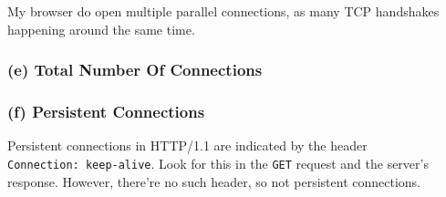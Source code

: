 \documentclass[
]{article}
\begin{document}
My browser do open multiple parallel connections, as many TCP handshakes
happening around the same time.

\hypertarget{e-total-number-of-connections}{%
\subsubsection{(e) Total Number Of
Connections}\label{e-total-number-of-connections}}

\hypertarget{f-persistent-connections}{%
\subsubsection{(f) Persistent
Connections}\label{f-persistent-connections}}

Persistent connections in HTTP/1.1 are indicated by the header
\texttt{Connection:\ keep-alive}. Look for this in the \texttt{GET}
request and the server's response. However, there're no such header, so
not persistent connections.
\end{document}
